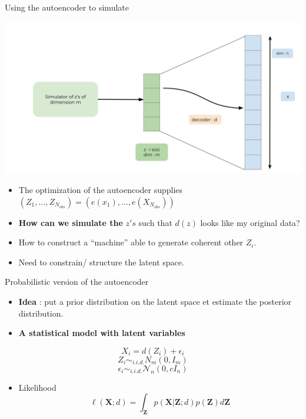 \documentclass[
  ignorenonframetext,
]{beamer}
\providecommand{\tightlist}{%
  \setlength{\itemsep}{0pt}\setlength{\parskip}{0pt}}
\begin{document}
\begin{frame}{Using the autoencoder to simulate}
\protect\hypertarget{using-the-autoencoder-to-simulate}{}
\begin{center}\includegraphics[width=0.7\linewidth]{images/VarAutoencoder} \end{center}

\begin{itemize}
\item
  The optimization of the autoencoder supplies
  \((Z_1, \dots, Z_{N_{obs}}) = (e(x_1), \dots, e(X_{N_{obs}}))\)
\item
  \textbf{How can we simulate the} \(z's\) such that \(d(z)\) looks like
  my original data?
\item
  How to construct a ``machine'' able to generate coherent other
  \(Z_i\).
\item
  Need to constrain/ structure the latent space.
\end{itemize}
\end{frame}

\begin{frame}{Probabilistic version of the autoencoder}
\protect\hypertarget{probabilistic-version-of-the-autoencoder}{}
\begin{itemize}
\item
  \textbf{Idea} : put a prior distribution on the latent space et
  estimate the posterior distribution.
\item
  \textbf{A statistical model with latent variables}
\end{itemize}

\[X_i =d(Z_i) + \epsilon_i\] \[Z_i \sim_{i.i.d.}N_m(0,I_m)\]
\[\epsilon_i \sim_{i.i.d.} \mathcal{N}_n(0,c I_n)\]

\begin{itemize}
\tightlist
\item
  Likelihood
  \[\ell(\mathbf{X}; d)  =  \int_{\mathbf{Z}} p(\mathbf{X} | \mathbf{Z};d)p(\mathbf{Z})d\mathbf{Z}\]
\end{itemize}
\end{frame}
\end{document}
